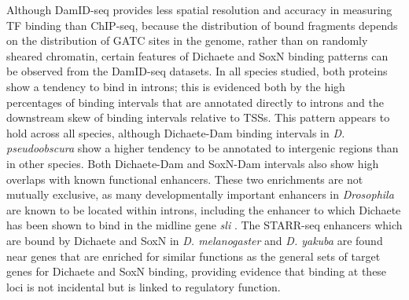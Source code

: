 Although DamID-seq provides less spatial resolution and accuracy in measuring TF binding than ChIP-seq, because the distribution of bound fragments depends on the distribution of GATC sites in the genome, rather than on randomly sheared chromatin, certain features of Dichaete and SoxN binding patterns can be observed from the DamID-seq datasets. In all species studied, both proteins show a tendency to bind in introns; this is evidenced both by the high percentages of binding intervals that are annotated directly to introns and the downstream skew of binding intervals relative to TSSs. This pattern appears to hold across all species, although Dichaete-Dam binding intervals in \emph{D. pseudoobscura} show a higher tendency to be annotated to intergenic regions than in other species. Both Dichaete-Dam and SoxN-Dam intervals also show high overlaps with known functional enhancers. These two enrichments are not mutually exclusive, as many developmentally important enhancers in \emph{Drosophila} are known to be located within introns, including the enhancer to which Dichaete has been shown to bind in the midline gene \emph{sli} \citep{aleksic_role_2013,ma_functional_2000}. The STARR-seq enhancers which are bound by Dichaete and SoxN in \emph{D. melanogaster} and \emph{D. yakuba} are found near genes that are enriched for similar functions as the general sets of target genes for Dichaete and SoxN binding, providing evidence that binding at these loci is not incidental but is linked to regulatory function.

